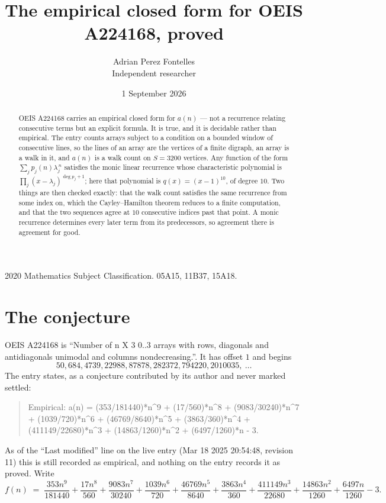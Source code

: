 \documentclass[11pt,a4paper]{article}
\title{The empirical closed form for OEIS A224168, proved}
\author{Adrian Perez Fontelles\\ \small Independent researcher}
\date{1 September 2026}
\theoremstyle{plain}
\theoremstyle{definition}
\begin{document}
\maketitle

\begin{abstract}
OEIS A224168 carries an empirical closed form for $a(n)$ --- not a recurrence relating
consecutive terms but an explicit formula. It is true, and it is decidable rather than
empirical. The entry counts arrays subject to a condition on a bounded window of consecutive lines, so the lines of an array are the
vertices of a finite digraph, an array is a walk in it, and $a(n)$ is a walk count on
$S=3200$ vertices. Any function of the form $\sum_j p_j(n)\lambda_j^{\,n}$ satisfies the
monic linear recurrence whose characteristic polynomial is
$\prod_j(x-\lambda_j)^{\deg p_j+1}$; here that polynomial is $q(x)=(x-1)^{10}$, of degree
$10$. Two things are then checked exactly: that the walk count satisfies the same
recurrence from some index on, which the Cayley--Hamilton theorem reduces to a finite
computation, and that the two sequences agree at $10$ consecutive indices past that
point. A monic recurrence determines every later term from its predecessors, so agreement
there is agreement for good.
\end{abstract}

\noindent\small 2020 Mathematics Subject Classification. 05A15, 11B37, 15A18.\normalsize

\section{The conjecture}

OEIS A224168 is ``Number of n X 3 0..3 arrays with rows, diagonals and antidiagonals unimodal and columns nondecreasing.''. It has offset $1$ and begins
\[
50, 684, 4739, 22988, 87878, 282372, 794220, 2010035,\ \dots
\]
The entry states, as a conjecture contributed by its author and never marked settled:
\begin{quote}
Empirical: a(n) = (353/181440)*n\^{}9 + (17/560)*n\^{}8 + (9083/30240)*n\^{}7 + (1039/720)*n\^{}6 + (46769/8640)*n\^{}5 + (3863/360)*n\^{}4 + (411149/22680)*n\^{}3 + (14863/1260)*n\^{}2 + (6497/1260)*n - 3.
\end{quote}
As of the ``Last modified'' line on the live entry (Mar 18 2025 20:54:48, revision 11) this is still
recorded as empirical, and nothing on the entry records it as proved. Write
\[
f(n)\;=\;\frac{353 n^{9}}{181440} + \frac{17 n^{8}}{560} + \frac{9083 n^{7}}{30240} + \frac{1039 n^{6}}{720} + \frac{46769 n^{5}}{8640} + \frac{3863 n^{4}}{360} + \frac{411149 n^{3}}{22680} + \frac{14863 n^{2}}{1260} + \frac{6497 n}{1260} - 3.
\]
\end{document}
